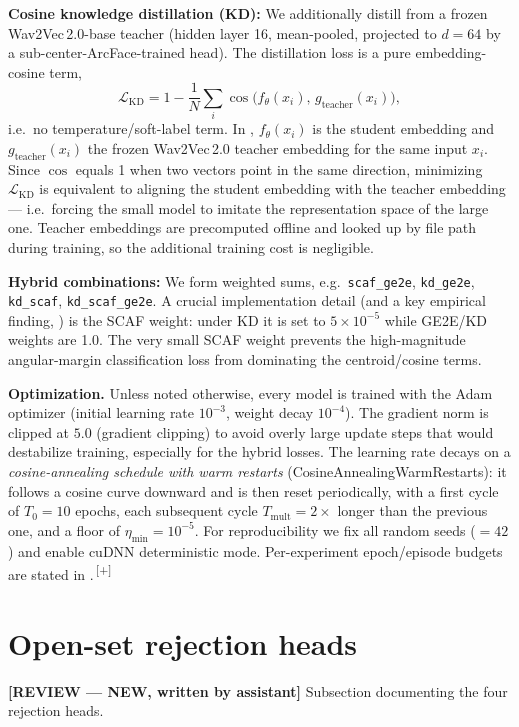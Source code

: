 \documentclass[12pt,a4paper]{report}
\newcommand{\NEW}[1]{{\color{addcolor}#1\,\textsuperscript{\tiny[+]}}}
\newcommand{\reviewnote}[1]{%
    \par\smallskip\noindent
    \colorbox{yellow!35}{\parbox{0.97\linewidth}{\small\textbf{[REVIEW — NEW, written by assistant]}\; #1}}%
    \par\smallskip}
\newcommand{\NEW}[1]{#1}
\newcommand{\reviewnote}[1]{}
\newcommand{\code}[1]{\texttt{\small #1}}
\begin{document}
\textbf{Cosine knowledge distillation (KD):} We additionally distill from a frozen
Wav2Vec\,2.0-base teacher (hidden layer 16, mean-pooled, projected to $d{=}64$ by
a sub-center-ArcFace-trained head). The distillation loss is a pure
embedding-cosine term,
\begin{equation}
\mathcal{L}_{\text{KD}} = 1 - \frac{1}{N}\sum_i
\cos\!\big(f_\theta(x_i),\, g_{\text{teacher}}(x_i)\big),
\label{eq:kd}
\end{equation}
i.e.\ no temperature/soft-label term. In , $f_\theta(x_i)$ is the
student embedding and $g_{\text{teacher}}(x_i)$ the frozen Wav2Vec\,2.0 teacher
embedding for the same input $x_i$. Since $\cos$ equals 1 when two vectors point in
the same direction, minimizing $\mathcal{L}_{\text{KD}}$ is equivalent to aligning
the student embedding with the teacher embedding --- i.e.\ forcing the small model
to imitate the representation space of the large one. Teacher embeddings are
precomputed offline and looked up by file path during training, so the additional
training cost is negligible.

\textbf{Hybrid combinations:} We form weighted sums, e.g.\ \code{scaf\_ge2e},
\code{kd\_ge2e}, \code{kd\_scaf}, \code{kd\_scaf\_ge2e}. A crucial implementation
detail (and a key empirical finding, ) is the SCAF weight: under
KD it is set to $5\times10^{-5}$ while GE2E/KD weights are 1.0. The very small
SCAF weight prevents the high-magnitude angular-margin classification loss from
dominating the centroid/cosine terms.

\NEW{\textbf{Optimization.} Unless noted otherwise, every model is trained with the
Adam optimizer (initial learning rate $10^{-3}$, weight decay $10^{-4}$). The
gradient norm is clipped at $5.0$ (gradient clipping) to avoid overly large update
steps that would destabilize training, especially for the hybrid losses. The
learning rate decays on a \emph{cosine-annealing schedule with warm restarts}
(CosineAnnealingWarmRestarts): it follows a cosine curve downward and is then reset
periodically, with a first cycle of $T_0{=}10$ epochs, each subsequent cycle
$T_{\text{mult}}{=}2\times$ longer than the previous one, and a floor of
$\eta_{\min}{=}10^{-5}$. For reproducibility we fix all random seeds ($=42$) and
enable cuDNN deterministic mode. Per-experiment epoch/episode budgets are stated in
\Cref{ch:results}.}

\section{Open-set rejection heads}\label{sec:openset}
\reviewnote{Subsection documenting the four rejection heads.}
\end{document}
